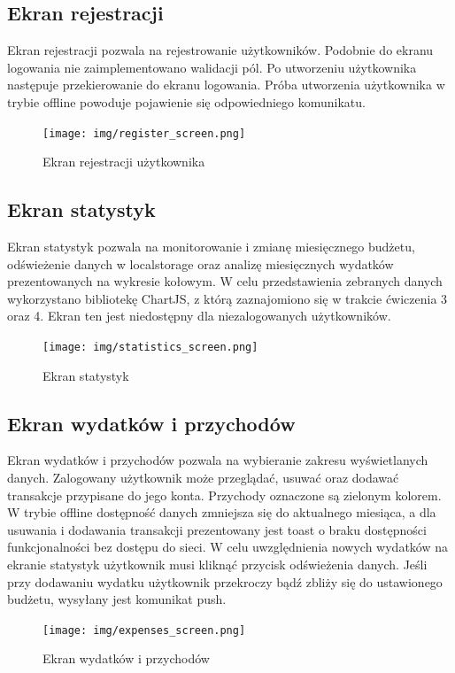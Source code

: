\documentclass[11pt,titlepage]{article}
\begin{document}
\newpage

\subsection{Ekran rejestracji}
Ekran rejestracji pozwala na rejestrowanie użytkowników. Podobnie do ekranu logowania nie zaimplementowano walidacji pól. Po utworzeniu użytkownika następuje przekierowanie do ekranu logowania. Próba utworzenia użytkownika w trybie offline powoduje pojawienie się odpowiedniego komunikatu.
\begin{figure}[!h]
	\begin{center}
		\texttt{[image: img/register\_screen.png]}
	\end{center}
  \caption{Ekran rejestracji użytkownika}
\end{figure}

\newpage

\subsection{Ekran statystyk}
Ekran statystyk pozwala na monitorowanie i zmianę miesięcznego budżetu, odświeżenie danych w localstorage oraz analizę miesięcznych wydatków prezentowanych na wykresie kołowym. W celu przedstawienia zebranych danych wykorzystano bibliotekę ChartJS, z którą zaznajomiono się w trakcie ćwiczenia 3 oraz 4. Ekran ten jest niedostępny dla niezalogowanych użytkowników.
\begin{figure}[!h]
	\begin{center}
		\texttt{[image: img/statistics\_screen.png]}
	\end{center}
  \caption{Ekran statystyk}
\end{figure}

\newpage

\subsection{Ekran wydatków i przychodów}
Ekran wydatków i przychodów pozwala na wybieranie zakresu wyświetlanych danych. Zalogowany użytkownik może przeglądać, usuwać oraz dodawać transakcje przypisane do jego konta. Przychody oznaczone są zielonym kolorem. W trybie offline dostępność danych zmniejsza się do aktualnego miesiąca, a dla usuwania i dodawania transakcji prezentowany jest toast o braku dostępności funkcjonalności bez dostępu do sieci. W celu uwzględnienia nowych wydatków na ekranie statystyk użytkownik musi kliknąć przycisk odświeżenia danych. Jeśli przy dodawaniu wydatku użytkownik przekroczy bądź zbliży się do ustawionego budżetu, wysyłany jest komunikat push.
\begin{figure}[!h]
	\begin{center}
		\texttt{[image: img/expenses\_screen.png]}
	\end{center}
  \caption{Ekran wydatków i przychodów}
\end{figure}
\end{document}
